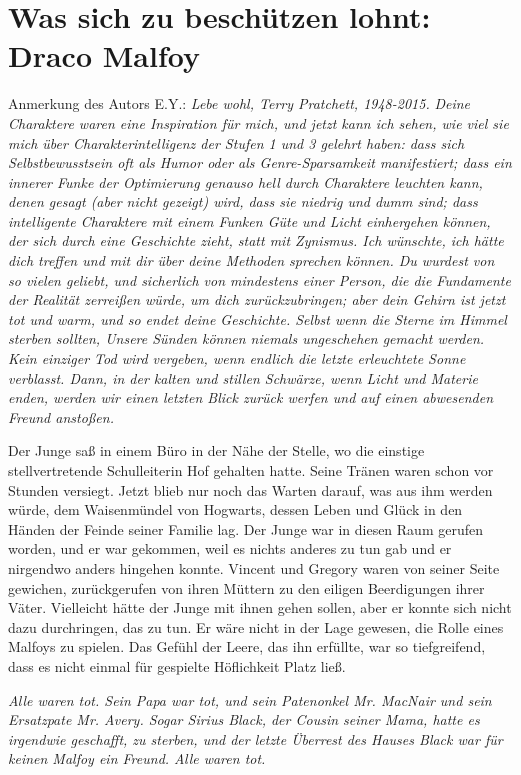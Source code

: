 \chapter{Was sich zu beschützen lohnt: Draco Malfoy}

Anmerkung des Autors E.Y.:
\emph{Lebe wohl, Terry Pratchett, 1948-2015.}
\emph{Deine Charaktere waren eine Inspiration für mich, und jetzt kann ich
sehen, wie viel sie mich über Charakterintelligenz der Stufen 1 und 3 gelehrt
haben: dass sich Selbstbewusstsein oft als Humor oder als Genre-Sparsamkeit
manifestiert; dass ein innerer Funke der Optimierung genauso hell durch
Charaktere leuchten kann, denen gesagt (aber nicht gezeigt) wird, dass sie
niedrig und dumm sind; dass intelligente Charaktere mit einem Funken Güte und
Licht einhergehen können, der sich durch eine Geschichte zieht, statt mit
Zynismus. Ich wünschte, ich hätte dich treffen und mit dir über deine Methoden
sprechen können. Du wurdest von so vielen geliebt, und sicherlich von mindestens
einer Person, die die Fundamente der Realität zerreißen würde, um dich
zurückzubringen; aber dein Gehirn ist jetzt tot und warm, und so endet deine
Geschichte. Selbst wenn die Sterne im Himmel sterben sollten, Unsere Sünden
können niemals ungeschehen gemacht werden. Kein einziger Tod wird vergeben, wenn
endlich die letzte erleuchtete Sonne verblasst. Dann, in der kalten und stillen
Schwärze, wenn Licht und Materie enden, werden wir einen letzten Blick zurück
werfen und auf einen abwesenden Freund anstoßen.}

Der Junge saß in einem Büro in der Nähe der Stelle, wo die einstige
stellvertretende Schulleiterin Hof gehalten hatte. Seine Tränen waren schon vor
Stunden versiegt. Jetzt blieb nur noch das Warten darauf, was aus ihm werden
würde, dem Waisenmündel von Hogwarts, dessen Leben und Glück in den Händen der
Feinde seiner Familie lag. Der Junge war in diesen Raum gerufen worden, und er
war gekommen, weil es nichts anderes zu tun gab und er nirgendwo anders hingehen
konnte. Vincent und Gregory waren von seiner Seite gewichen, zurückgerufen von
ihren Müttern zu den eiligen Beerdigungen ihrer Väter. Vielleicht hätte der
Junge mit ihnen gehen sollen, aber er konnte sich nicht dazu durchringen, das zu
tun. Er wäre nicht in der Lage gewesen, die Rolle eines Malfoys zu spielen. Das
Gefühl der Leere, das ihn erfüllte, war so tiefgreifend, dass es nicht einmal
für gespielte Höflichkeit Platz ließ.

\emph{Alle waren tot. Sein Papa war tot, und sein Patenonkel Mr. MacNair und
sein Ersatzpate Mr. Avery. Sogar Sirius Black, der Cousin seiner Mama, hatte
es irgendwie geschafft, zu sterben, und der letzte Überrest des Hauses Black war
für keinen Malfoy ein Freund. Alle waren tot.}


